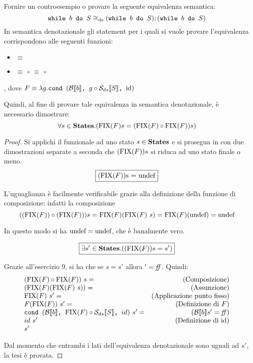{
  Fornire un controesempio o provare la seguente equivalenza semantica:
  $$
  \wbS{b}{S} \eqDS (\wbS{b}{S});(\wbS{b}{S})
  $$
}
{}
In semantica denotazionale gli statement per i quali si vuole provare
l'equivalenza corrispondono alle seguenti funzioni:
\begin{itemize}
  \item {}
        $\equiv$
  \item {}
        $\equiv$
         $\circ$ 
        $\equiv$
         $\circ$ 
\end{itemize}
, dove $F \equiv{} \lambda{g}.\cond{b}{g \circ \dsCtxt{S}}{\idDS}$

Quindi, al fine di provare tale equivalenza in semantica denotazionale, è
necessario dimostrare:
\begin{equation}
\forall s \in \states.(\fixp{F}s = (\fixp{F} \circ \fixp{F})s)
\label{hw10-thesis}
\end{equation}

\begin{proof}

Si applichi il funzionale  ad uno stato $s\in\states$ e si prosegua in
con due dimostrazioni separate a seconda che $(\fixp{F}) s$ si riduca ad uno
stato finale o meno.
$$
\boxed{(\fixp{F}) $s = \undefDS$}
$$

L'uguaglianza è facilmente verificabile grazie alla definizione della funzione
di composizione: infatti la composizione 
$$
((\fixp{F}) \circ (\fixp{F})) s = \fixp{F}(\fixp{F}\text{ }s) = \fixp{F}(\undefDS) = \undefDS
$$


In questo modo si ha $\undefDS = \undefDS$, che è banalmente vero.

$$
\boxed{\exists s' \in \states.((\fixp{F}) s = s')}
$$

Grazie all'esercizio 9, si ha che se  $s = s'$ allora
$' = \semfalse$. Quindi:
$$
\begin{array}{lr}
(\fixp{F} \circ \fixp{F})\ s = & \text{(Composizione)} \\
(\fixp{F} (\fixp{F}\ s)) = & \text{(Assunzione)} \\
\fixp{F}\  s' = & \text{(Applicazione punto fisso)}\\
F(\fixp{F})\ s' = & \text{(Definizione di $F$)} \\
\cond{b}{\fixp{F} \circ \dsCtxt{S}}{id}\ s' = & (\B{b}' = \semfalse) \\
id\ s' & \text{(Definizione di \idDS)} \\
s'
\end{array}
$$



Dal momento che entrambi i lati dell'equivalenza denotazionale sono uguali ad
$s'$, la tesi è provata.

\end{proof}
